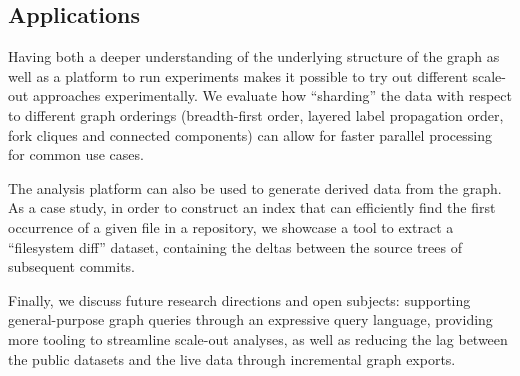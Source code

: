 \subsection*{Applications}

Having both a deeper understanding of the underlying structure of the graph as
well as a platform to run experiments makes it possible to try out different
scale-out approaches experimentally. We evaluate how ``sharding'' the data with
respect to different graph orderings (breadth-first order, layered label
propagation order, fork cliques and connected components) can allow for faster
parallel processing for common use cases.

The analysis platform can also be used to generate derived data from the graph.
As a case study, in order to construct an index that can efficiently find the
first occurrence of a given file in a repository, we showcase a tool to extract
a ``filesystem diff'' dataset, containing the deltas between the source trees
of subsequent commits.

Finally, we discuss future research directions and open subjects: supporting
general-purpose graph queries through an expressive query language, providing
more tooling to streamline scale-out analyses, as well as reducing the lag
between the public datasets and the live data through incremental graph
exports.

